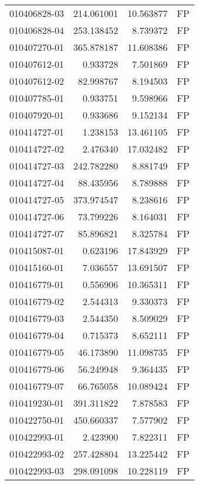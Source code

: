\begin{tabular}{lrrl}
010406828-03 &  214.061001 &      10.563877 &   FP \\
010406828-04 &  253.138452 &       8.739372 &   FP \\
010407270-01 &  365.878187 &      11.608386 &   FP \\
010407612-01 &    0.933728 &       7.501869 &   FP \\
010407612-02 &   82.998767 &       8.194503 &   FP \\
010407785-01 &    0.933751 &       9.598966 &   FP \\
010407920-01 &    0.933686 &       9.152134 &   FP \\
010414727-01 &    1.238153 &      13.461105 &   FP \\
010414727-02 &    2.476340 &      17.032482 &   FP \\
010414727-03 &  242.782280 &       8.881749 &   FP \\
010414727-04 &   88.435956 &       8.789888 &   FP \\
010414727-05 &  373.974547 &       8.238616 &   FP \\
010414727-06 &   73.799226 &       8.164031 &   FP \\
010414727-07 &   85.896821 &       8.325784 &   FP \\
010415087-01 &    0.623196 &      17.843929 &   FP \\
010415160-01 &    7.036557 &      13.691507 &   FP \\
010416779-01 &    0.556906 &      10.365311 &   FP \\
010416779-02 &    2.544313 &       9.330373 &   FP \\
010416779-03 &    2.544350 &       8.509029 &   FP \\
010416779-04 &    0.715373 &       8.652111 &   FP \\
010416779-05 &   46.173890 &      11.098735 &   FP \\
010416779-06 &   56.249948 &       9.364435 &   FP \\
010416779-07 &   66.765058 &      10.089424 &   FP \\
010419230-01 &  391.311822 &       7.878583 &   FP \\
010422750-01 &  450.660337 &       7.577902 &   FP \\
010422993-01 &    2.423900 &       7.822311 &   FP \\
010422993-02 &  257.428804 &      13.225442 &   FP \\
010422993-03 &  298.091098 &      10.228119 &   FP \\

\end{tabular}
